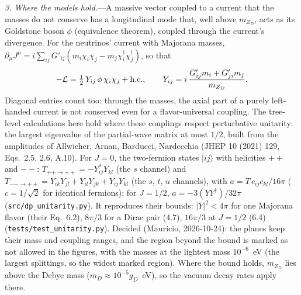 \documentclass[11pt,a4paper]{article}
\newcommand{\file}[1]{\nolinkurl{#1}}
\newcommand{\mzd}{m_{Z_D}}
\newcommand{\gd}{g_D}
\begin{document}
\textit{3. Where the models hold.}---A massive vector coupled to a current that the masses do not conserve has a
longitudinal mode that, well above $\mzd$, acts as its Goldstone boson $\phi$ (equivalence theorem), coupled through
the current's divergence. For the neutrinos' current with Majorana masses,
$\partial_\mu J^\mu = i\sum_{ij}G'_{ij}(m_i\chi_i\chi_j - m_j\chi_i^\dagger\chi_j^\dagger)$, so that
\begin{equation}
  -\mathcal{L} = \tfrac12\,Y_{ij}\,\phi\,\chi_i\chi_j + {\rm h.c.}, \qquad
  Y_{ij} = i\,\frac{G'_{ij}m_i + G'_{ji}m_j}{\mzd} .
\end{equation}
Diagonal entries count too: through the masses, the axial part of a purely left-handed current is not conserved even
for a flavor-universal coupling. The tree-level calculations here hold where these couplings respect perturbative
unitarity: the largest eigenvalue of the partial-wave matrix at most $1/2$, built from the amplitudes of Allwicher,
Arnan, Barducci, Nardecchia (JHEP 10 (2021) 129, Eqs.~2.5, 2.6, A.10). For $J=0$, the two-fermion states $|ij\rangle$
with helicities $++$ and $--$: $T_{++\to++} = -Y^*_{ij}Y_{kl}$ (the $s$ channel) and
$T_{--\to++} = Y_{ik}Y_{jl} + Y_{il}Y_{jk} + Y_{ij}Y_{kl}$ (the $s$, $t$, $u$ channels), with
$a = T\,c_{ij}c_{kl}/16\pi$ ($c = 1/\sqrt2$ for identical fermions); for $J=1/2$, $a = -3(YY^\dagger)/32\pi$
(\file{src/dp\_unitarity.py}). It reproduces their bounds: $|Y|^2 < 4\pi$ for one Majorana flavor (their Eq.~6.2),
$8\pi/3$ for a Dirac pair (4.7), $16\pi/3$ at $J = 1/2$ (6.4) (\file{tests/test\_unitarity.py}). Decided (Mauricio,
2026-10-24): the planes keep their mass and coupling ranges, and the region beyond the bound is marked as not
allowed in the figures, with the masses at the lightest mass $10^{-6}$~eV (the largest splittings, so the widest
marked region). Where the bound holds, $\mzd$ lies above the Debye mass
($m_D \approx 10^{-5}\gd$~eV), so the vacuum decay rates apply there.
\end{document}

